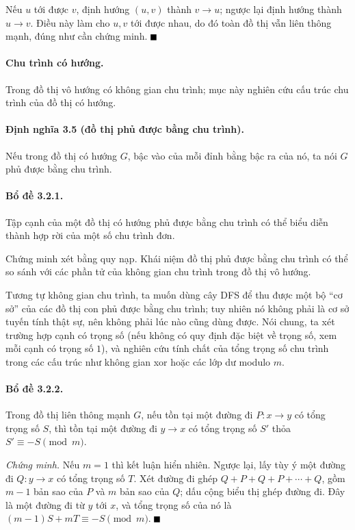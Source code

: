 \documentclass[11pt]{article}
\renewcommand{\leadsto}{\mathrel{\longrightarrow}}
\providecommand{\square}{\mathord{\vcenter{\hrule height .6em width .6em}}}
\begin{document}
Nếu $u$ tới được $v$, định hướng $(u,v)$ thành $v\to u$; ngược lại định hướng
thành $u\to v$. Điều này làm cho $u,v$ tới được nhau, do đó toàn đồ thị vẫn liên
thông mạnh, đúng như cần chứng minh. \hfill$\square$

\paragraph{Chu trình có hướng.}
Trong đồ thị vô hướng có không gian chu trình; mục này nghiên cứu cấu trúc chu
trình của đồ thị có hướng.

\paragraph{Định nghĩa 3.5 (đồ thị phủ được bằng chu trình).}
Nếu trong đồ thị có hướng $G$, bậc vào của mỗi đỉnh bằng bậc ra của nó, ta nói
$G$ phủ được bằng chu trình.

\paragraph{Bổ đề 3.2.1.}
Tập cạnh của một đồ thị có hướng phủ được bằng chu trình có thể biểu diễn thành
hợp rời của một số chu trình đơn.

Chứng minh xét bằng quy nạp. Khái niệm đồ thị phủ được bằng chu trình có thể so
sánh với các phần tử của không gian chu trình trong đồ thị vô hướng.

Tương tự không gian chu trình, ta muốn dùng cây DFS để thu được một bộ ``cơ sở''
của các đồ thị con phủ được bằng chu trình; tuy nhiên nó không phải là cơ sở
tuyến tính thật sự, nên không phải lúc nào cũng dùng được. Nói chung, ta xét
trường hợp cạnh có trọng số (nếu không có quy định đặc biệt về trọng số, xem mỗi
cạnh có trọng số $1$), và nghiên cứu tính chất của tổng trọng số chu trình trong
các cấu trúc như không gian xor hoặc các lớp dư modulo $m$.

\paragraph{Bổ đề 3.2.2.}
Trong đồ thị liên thông mạnh $G$, nếu tồn tại một đường đi
$P:x\leadsto y$ có tổng trọng số $S$, thì tồn tại một đường đi $y\leadsto x$ có
tổng trọng số $S'$ thỏa $S'\equiv -S\pmod m$.

\emph{Chứng minh.}
Nếu $m=1$ thì kết luận hiển nhiên. Ngược lại, lấy tùy ý một đường đi
$Q:y\leadsto x$ có tổng trọng số $T$. Xét đường đi ghép
$Q+P+Q+P+\cdots+Q$, gồm $m-1$ bản sao của $P$ và $m$ bản sao của $Q$; dấu cộng
biểu thị ghép đường đi. Đây là một đường đi từ $y$ tới $x$, và tổng trọng số của
nó là $(m-1)S+mT\equiv -S\pmod m$. \hfill$\square$
\end{document}
